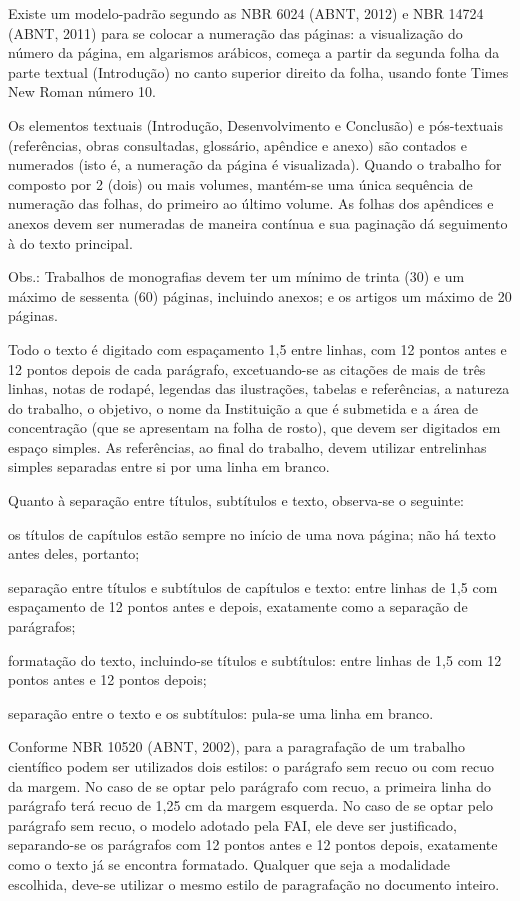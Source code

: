 \begin{Desenvolvimento}
Existe um modelo-padrão segundo as NBR 6024 (ABNT, 2012) e NBR 14724 (ABNT, 2011) para se colocar a numeração das páginas: a visualização do número da página, em algarismos arábicos, começa a partir da segunda folha da parte textual (Introdução) no canto superior direito da folha, usando fonte Times New Roman número 10.

Os elementos textuais (Introdução, Desenvolvimento e Conclusão) e pós-textuais (referências, obras consultadas, glossário, apêndice e anexo) são contados e numerados (isto é, a numeração da página é visualizada). Quando o trabalho for composto por 2 (dois) ou mais volumes, mantém-se uma única sequência de numeração das folhas, do primeiro ao último volume. As folhas dos apêndices e anexos devem ser numeradas de maneira contínua e sua paginação dá seguimento à do texto principal.

Obs.: Trabalhos de monografias devem ter um mínimo de trinta (30) e um máximo de sessenta (60) páginas, incluindo anexos; e os artigos um máximo de 20 páginas.

Todo o texto é digitado com espaçamento 1,5 entre linhas, com 12 pontos antes e 12 pontos depois de cada parágrafo, excetuando-se as citações de mais de três linhas, notas de rodapé, legendas das ilustrações, tabelas e referências, a natureza do trabalho, o objetivo, o nome da Instituição a que é submetida e a área de concentração (que se apresentam na folha de rosto), que devem ser digitados em espaço simples. As referências, ao final do trabalho, devem utilizar entrelinhas simples separadas entre si por uma linha em branco.

Quanto à separação entre títulos, subtítulos e texto, observa-se o seguinte:

\begin{alinea}
  \item os títulos de capítulos estão sempre no início de uma nova página; não há texto antes deles, portanto;
  \item separação entre títulos e subtítulos de capítulos e texto: entre linhas de 1,5 com espaçamento de 12 pontos antes e depois, exatamente como a separação de parágrafos;
  \item formatação do texto, incluindo-se títulos e subtítulos: entre linhas de 1,5 com 12 pontos antes e 12 pontos depois;
  \item separação entre o texto e os subtítulos: pula-se uma linha em branco.
\end{alinea}

Conforme NBR 10520 (ABNT, 2002), para a paragrafação de um trabalho científico podem ser utilizados dois estilos: o parágrafo sem recuo ou com recuo da margem. No caso de se optar pelo parágrafo com recuo, a primeira linha do parágrafo terá recuo de 1,25 cm da margem esquerda. No caso de se optar pelo parágrafo sem recuo, o modelo adotado pela FAI, ele deve ser justificado, separando-se os parágrafos com 12 pontos antes e 12 pontos depois, exatamente como o texto já se encontra formatado. Qualquer que seja a modalidade escolhida, deve-se utilizar o mesmo estilo de paragrafação no documento inteiro.


\end{Desenvolvimento}
